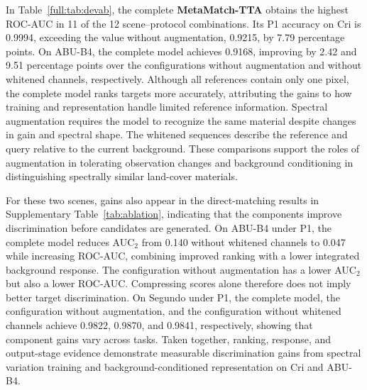 \documentclass[a4paper,11pt]{article}
\newcommand{\method}{\textbf{MetaMatch-TTA}}
\begin{document}
In Table~\ref{full:tab:devab}, the complete \method{} obtains the highest ROC-AUC in 11 of the 12 scene--protocol combinations. Its P1 accuracy on Cri is 0.9994, exceeding the value without augmentation, 0.9215, by 7.79 percentage points. On ABU-B4, the complete model achieves 0.9168, improving by 2.42 and 9.51 percentage points over the configurations without augmentation and without whitened channels, respectively. Although all references contain only one pixel, the complete model ranks targets more accurately, attributing the gains to how training and representation handle limited reference information. Spectral augmentation requires the model to recognize the same material despite changes in gain and spectral shape. The whitened sequences describe the reference and query relative to the current background. These comparisons support the roles of augmentation in tolerating observation changes and background conditioning in distinguishing spectrally similar land-cover materials.



For these two scenes, gains also appear in the direct-matching results in Supplementary Table~\ref{tab:ablation}, indicating that the components improve discrimination before candidates are generated. On ABU-B4 under P1, the complete model reduces AUC$_2$ from 0.140 without whitened channels to 0.047 while increasing ROC-AUC, combining improved ranking with a lower integrated background response. The configuration without augmentation has a lower AUC$_2$ but also a lower ROC-AUC. Compressing scores alone therefore does not imply better target discrimination. On Segundo under P1, the complete model, the configuration without augmentation, and the configuration without whitened channels achieve 0.9822, 0.9870, and 0.9841, respectively, showing that component gains vary across tasks. Taken together, ranking, response, and output-stage evidence demonstrate measurable discrimination gains from spectral variation training and background-conditioned representation on Cri and ABU-B4.
\end{document}
